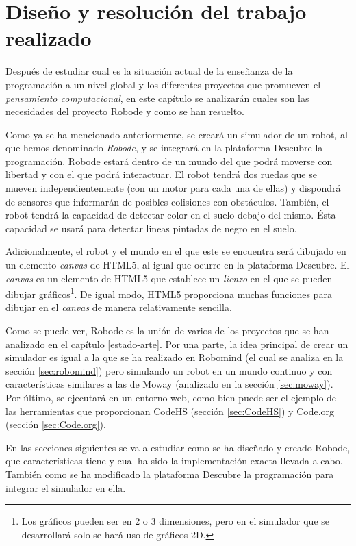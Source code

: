 \chapter{Diseño y resolución del trabajo realizado}
\label{diseno}

Después de estudiar cual es la situación actual de la enseñanza de la programación a un nivel global y los diferentes proyectos que promueven el \emph{pensamiento computacional}, en este capítulo se analizarán cuales son las necesidades del proyecto Robode y como se han resuelto.

Como ya se ha mencionado anteriormente, se creará un simulador de un robot, al que hemos denominado \emph{Robode}, y se integrará en la plataforma Descubre la programación. Robode  estará dentro de un mundo del que podrá moverse con libertad y con el que podrá interactuar. El robot tendrá dos ruedas que se mueven independientemente (con un motor para cada una de ellas) y dispondrá de sensores que informarán de posibles colisiones con obstáculos. También, el robot tendrá la capacidad de detectar color en el suelo debajo del mismo. Ésta capacidad se usará para detectar lineas pintadas de negro en el suelo.

Adicionalmente, el robot y el mundo en el que este se encuentra será dibujado en un elemento \emph{canvas} de HTML5, al igual que ocurre en la plataforma Descubre. El \emph{canvas} es un elemento de HTML5 que establece un \emph{lienzo} en el que se pueden dibujar gráficos\footnote{Los gráficos pueden ser en 2 o 3 dimensiones, pero en el simulador que se desarrollará solo se hará uso de gráficos 2D.}. De igual modo, HTML5 proporciona muchas funciones para dibujar en el \emph{canvas} de manera relativamente sencilla.


Como se puede ver, Robode es la unión de varios de los proyectos que se han analizado en el capítulo \ref{estado-arte}. Por una parte, la idea principal de crear un simulador es igual a la que se ha realizado en Robomind (el cual se analiza en la sección \ref{sec:robomind}) pero simulando un robot en un mundo continuo y con características similares a las de Moway (analizado en la sección \ref{sec:moway}). Por último, se ejecutará en un entorno web, como bien puede ser el ejemplo de las herramientas que proporcionan CodeHS (sección \ref{sec:CodeHS}) y Code.org (sección \ref{sec:Code.org}). 


En las secciones siguientes se va a estudiar como se ha diseñado y creado Robode, que características tiene y cual ha sido la implementación exacta llevada a cabo. También como se ha modificado la plataforma Descubre la programación para integrar el simulador en ella.



